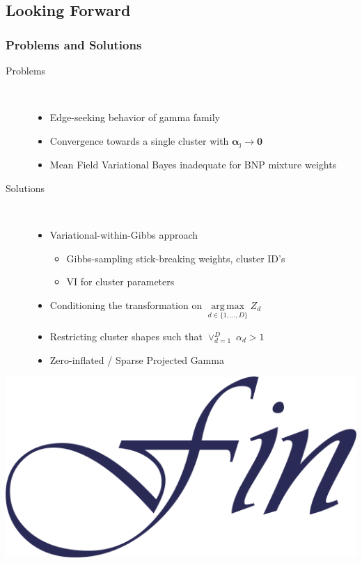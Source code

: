 \documentclass[aspectratio=169,10pt,notes]{beamer}
\DeclareMathOperator*{\argmax}{arg\,max}
\newlength{\frametextheight}
\begin{document}
\subsection{Looking Forward}

\begin{frame}
    \frametitle{Problems and Solutions}
    \begin{description}
        \item[Problems]~ 
            \begin{itemize}
                \item Edge-seeking behavior of gamma family
                \item Convergence towards a single cluster with $\bm{\alpha}_{\jmath} \to \bm{0}$
                \item Mean Field Variational Bayes inadequate for BNP mixture weights
            \end{itemize}
        \item[Solutions]~
            \begin{itemize}
                \item Variational-within-Gibbs approach \cite{Loaizamaya2022}
                \begin{itemize}
                    \item Gibbs-sampling stick-breaking weights, cluster ID's
                    \item VI for cluster parameters
                \end{itemize}
                \item Conditioning the transformation on 
                    $\argmax\limits_{d \in \lbrace 1,\ldots, D\rbrace} Z_d$
                \item Restricting cluster shapes such that $\vee_{d = 1}^D\; \alpha_d > 1$
                \item Zero-inflated / Sparse Projected Gamma
            \end{itemize}
    \end{description}
\end{frame}

\begin{frame}[plain]
    \begin{center}
        \includegraphics[height=0.7\frametextheight]{./ch1/images/fin}
    \end{center}
\end{frame} %
\end{document}
